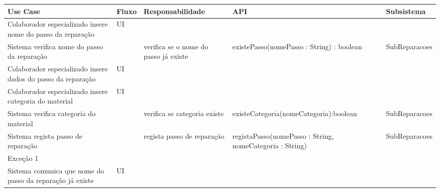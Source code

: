 \documentclass[../relatorio.tex]{subfiles}
\begin{document}
\begin{landscape}
    \begin{table}[!h]
        \centering
        \begin{tabular}{|p{5cm}|p{1cm}|p{4cm}|p{6cm}|p{3cm}|}
            \hline
            \rowcolor{gray!20!white}
            Use Case & Fluxo                                            & Responsabilidade & API & Subsistema \\
            \hline
            \rowcolor{yellow}
            Colaborador especializado insere nome do passo da reparação
                     & UI
                     & 
                     & 
                     & 
            \\
            \hline
            Sistema verifica nome do passo da reparação
                     & 
                     & verifica se o nome do passo já existe
                     & existePasso(nomePasso : String) : boolean
                     & SubReparacoes
            \\
            \hline
            \rowcolor{yellow}
            Colaborador especializado insere dados do passo da reparação
                     & UI
                     & 
                     & 
                     & 
            \\
            \hline
            \rowcolor{yellow}
            Colaborador especializado insere categoria do material
                     & UI
                     & 
                     & 
                     & 
            \\
            \hline
            Sistema verifica categoria do material
                     & 
                     & verifica se categoria existe
                     & existeCategoria(nomeCategoria):boolean
                     & SubReparacoes
            \\
            \hline
            Sistema regista passo de reparação
                     & 
                     & regista passo de reparação
                     & registaPasso(nomePasso : String, nomeCategoria : String)
                     & SubReparacoes
            \\
            \hline
            \rowcolor{red!30}
            Exceção 1 &                                                  &                  &     &            \\
            \hline
            \rowcolor{yellow}
            Sistema comunica que nome do passo da reparação já existe
                     & UI
                     & 
                     & 
                     & 

\end{tabular}
\end{table}
\end{landscape}
\end{document}
